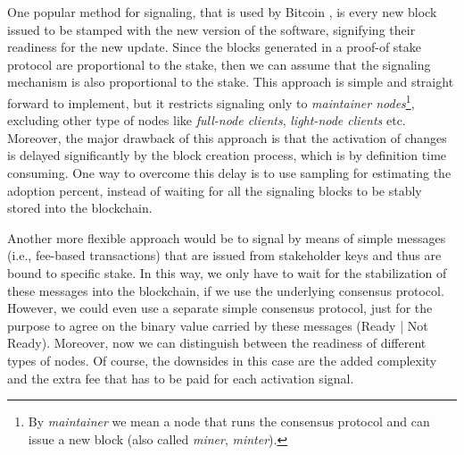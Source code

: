 One popular method for signaling, that is used by Bitcoin \cite{bitcoin}, is every new block issued to be stamped with the new version of the software, signifying their readiness for the new update. Since the blocks generated in a proof-of stake protocol are proportional to the stake, then we can assume that the signaling mechanism is also proportional to the stake. This approach is simple and straight forward to implement, but it restricts signaling only to \emph{maintainer nodes}\footnote{By \emph{maintainer} we mean a node that runs the consensus protocol and can issue a new block (also called \emph{miner}, \emph{minter}).}, excluding other type of nodes like \emph{full-node clients}, \emph{light-node clients} etc. Moreover, the major drawback of this approach is that the activation of changes is delayed significantly by the block creation process, which is by definition time consuming. One way to overcome this delay is to use sampling for estimating the adoption percent, instead of waiting for all the signaling blocks to be stably stored into the blockchain.

Another more flexible approach would be to signal by means of simple messages (i.e., fee-based transactions) that are issued from stakeholder keys and thus are bound to specific stake. In this way, we only have to wait for the stabilization of these messages into the blockchain, if we use the underlying consensus protocol.
 However, we could even use a separate simple consensus protocol, just for the purpose to agree on the binary value carried by these messages (Ready | Not Ready). Moreover, now we can distinguish between the readiness of different types of nodes. Of course, the downsides in this case are the  added complexity and the extra fee that has to be paid for each activation signal.


